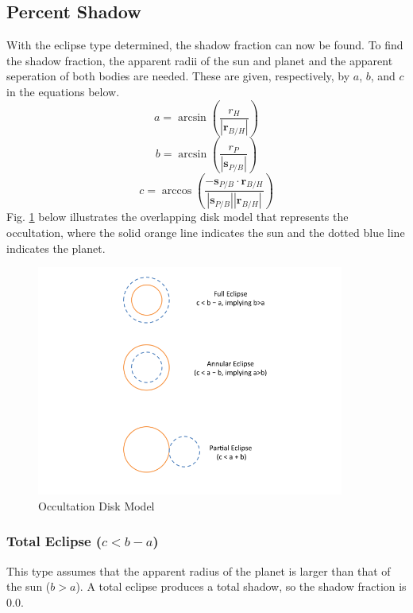 \subsection{Percent Shadow}
With the eclipse type determined, the shadow fraction can now be found. To find the shadow fraction, the apparent radii of the sun and planet and the apparent seperation of both bodies are needed. These are given, respectively, by $a$, $b$, and $c$ in the equations below.
\begin{equation} \label{eq:15}
a = \arcsin(\frac{r_H}{|\bm{r}_{B/H}|})
\end{equation}
\begin{equation} \label{eq:16}
b = \arcsin(\frac{r_P}{|\bm{s}_{P/B}|})
\end{equation}
\begin{equation} \label{eq:17}
c = \arccos(\frac{-\bm{s}_{P/B} \cdot \bm{r}_{B/H}}{|\bm{s}_{P/B}| |\bm{r}_{B/H}|})
\end{equation}
Fig. \ref{fig:disk} below illustrates the overlapping disk model that represents the occultation, where the solid orange line indicates the sun and the dotted blue line indicates the planet.
\begin{figure}
		\centering
	\captionsetup{justification=centering}
	\includegraphics[width=0.9\textwidth]{Figures/diskModel.png}
	\caption{Occultation Disk Model}\label{fig:disk}
\end{figure}
\subsubsection{Total Eclipse ($c < b-a$)}

This type assumes that the apparent radius of the planet is larger than that of the sun ($b>a$). A total eclipse produces a total shadow, so the shadow fraction is 0.0.
